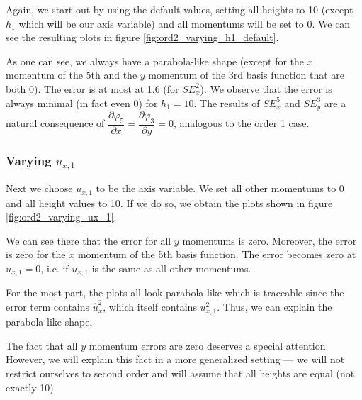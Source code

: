 \documentclass{article}
\newcommand{\pd}[2]{\dfrac{\partial #1}{\partial #2}}
\renewcommand{\phi}{\varphi}
\begin{document}
Again, we start out by using the default values, setting all heights to 10 (except $h_1$ which will be our axis variable) and all momentums will be set to 0. We can see the resulting plots in figure \ref{fig:ord2_varying_h1_default}.



As one can see, we always have a parabola-like shape (except for the $x$ momentum of the 5th and the $y$ momentum of the 3rd basis function that are both 0). The error is at most at 1.6 (for $SE_x^2$). We observe that the error is always minimal (in fact even 0) for $h_1=10$. The results of $SE_x^5$ and $SE_y^3$ are a natural consequence of $\pd{\phi_5}{x}=\pd{\phi_3}{y}=0$, analogous to the order 1 case.

\subsubsection{\texorpdfstring{Varying $u_{x,1}$}{Varying ux1}}
\label{sec:stiffness-analysis-ord2-default-var-ux1}

Next we choose $u_{x,1}$ to be the axis variable. We set all other momentums to 0 and all height values to 10. If we do so, we obtain the plots shown in figure \ref{fig:ord2_varying_ux_1}.



We can see there that the error for all $y$ momentums is zero. Moreover, the error is zero for the $x$ momentum of the 5th basis function. The error becomes zero at $u_{x,1}=0$, i.e. if $u_{x,1}$ is the same as all other momentums.

For the most part, the plots all look parabola-like which is traceable since the error term contains $\widehat{u}_x^2$, which itself contains $u_{x,1}^2$. Thus, we can explain the parabola-like shape.

The fact that all $y$ momentum errors are zero deserves a special attention. However, we will explain this fact in a more generalized setting --- we will not restrict ourselves to second order and will assume that all heights are equal (not exactly 10).


\end{document}
